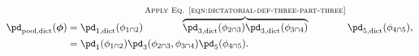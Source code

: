 \begin{equation}
  \begin{aligned}
    \pd_{\text{pool,dict}}(\boldsymbol{\phi})
    &= \pd_{1, \text{dict}}(\phi_{1 \cap 2})
      \overbrace{\pd_{3, \text{dict}}(\phi_{2 \cap 3}) \pd_{3, \text{dict}}(\phi_{3 \cap 4})}^{\textsc{\footnotesize{Apply Eq. \eqref{eqn:dictatorial-def-three-part-three}}}}
      \pd_{5, \text{dict}}(\phi_{4 \cap 5}), \\
    &= \pd_{1}(\phi_{1 \cap 2})
      \pd_{3}(\phi_{2 \cap 3}, \phi_{3 \cap 4})
      \pd_{5}(\phi_{4 \cap 5}).
  \end{aligned}
  \label{eqn:dictatorial-def-two-example-one}
\end{equation}

